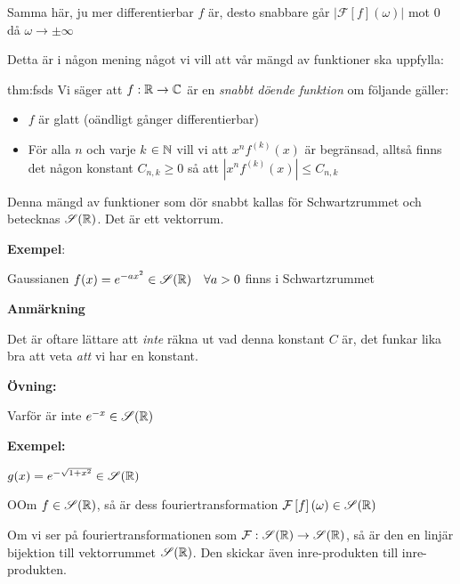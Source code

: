 \noindent Samma här, ju mer differentierbar $f$ är, desto snabbare går $\left|\mathcal{F}\left[f\right](\omega)\right|$ mot 0 då $\omega\to\pm\infty$
\par\bigskip
\noindent Detta är i någon mening något vi vill att vår mängd av funktioner ska uppfylla:
\par\bigskip
\begin{theo}{thm:fsds}
  Vi säger att $f:\mathbb{R}\to\mathbb{C}$ är en \textit{snabbt döende funktion} om följande gäller:\par
  \begin{itemize}
    \item $f$ är glatt (oändligt gånger differentierbar)
      \par\bigskip
    \item För alla $n$ och varje $k$ $\in\mathbb{N}$ vill vi att $x^nf^{(k)}(x)$ är begränsad, alltså finns det någon konstant $C_{n,k}\geq0$ så att $\left|x^nf^{(k)}(x)\right|\leq C_{n,k}$
  \end{itemize}
\end{theo}
\par\bigskip
\noindent Denna mängd av funktioner som dör snabbt kallas för Schwartzrummet och betecknas $\mathscr{S}(\mathbb{R})$. Det är ett vektorrum.
\par\bigskip
\noindent\textbf{Exempel}:\par
\noindent Gaussianen $f(x) = e^{-ax^2}\in\mathscr{S}(\mathbb{R})\quad\forall a>0$ finns i Schwartzrummet  
\par\bigskip
\noindent\textbf{Anmärkning}\par
\noindent Det är oftare lättare att \textit{inte} räkna ut vad denna konstant $C$ är, det funkar lika bra att veta \textit{att} vi har en konstant.
\par\bigskip
\noindent\textbf{Övning:}\par
\noindent Varför är inte $e^{-x}\in\mathscr{S}(\mathbb{R})$ 
\par\bigskip
\noindent\textbf{Exempel:}\par
\noindent $g(x) = e^{-\sqrt{1+x^2}}\in\mathscr{S}(\mathbb{R})$
\newpage
\begin{theo}
  OOm $f\in\mathscr{S}(\mathbb{R})$, så är dess fouriertransformation $\mathcal{F}\left[f\right](\omega)\in\mathscr{S}(\mathbb{R})$
  \par\bigskip
  \noindent Om vi ser på fouriertransformationen som $\mathcal{F}:\mathscr{S}(\mathbb{R})\to\mathscr{S}(\mathbb{R})$, så är den en linjär bijektion till vektorrummet $\mathscr{S}(\mathbb{R})$. Den skickar även inre-produkten till inre-produkten. \par
\end{theo}
